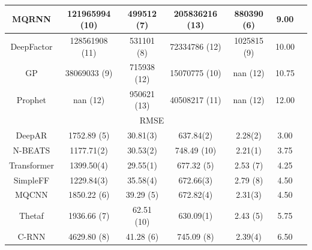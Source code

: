 \begin{table}[htb]
\begin{tabular}{ccccccc}
    MQRNN       & \cellcolor{red!30} 121965994 (10) & 499512 (7)                      & \cellcolor{red!70} 205836216 (13) & 880390 (6)                      & 9.00                \\\hline
    DeepFactor  & \cellcolor{red!50} 128561908 (11) & 531101 (8)                      & \cellcolor{red!50} 72334786 (12)  & 1025815 (9)                     & 10.00               \\\hline
    GP          & 38069033 (9)                      & \cellcolor{red!50} 715938 (12)  & \cellcolor{red!10} 15070775 (10)  & \cellcolor{red!70} nan (12)     & 10.75               \\\hline
    Prophet     & \cellcolor{red!70} nan (12)       & \cellcolor{red!70} 950621 (13)  & \cellcolor{red!30} 40508217 (11)  & \cellcolor{red!70} nan (12)     & 12.00               \\\hline
    \multicolumn{6}{c}{\cellcolor{gray!25}RMSE}                                                                                                                                   \\
    \hline
    DeepAR      & 1752.89 (5)                       & 30.81(3) \cellcolor{green!50}   & 637.84(2) \cellcolor{green!70}    & 2.28(2) \cellcolor{green!70}    & 3.00                \\\hline
    N-BEATS     & 1177.71(2) \cellcolor{green!70}   & 30.53(2) \cellcolor{green!70}   & \cellcolor{red!10} 748.49 (10)    & 2.21(1) \cellcolor{green!100}   & 3.75                \\\hline
    Transformer & 1399.50(4) \cellcolor{green!30}   & 29.55(1) \cellcolor{green!100}  & 677.32 (5)                        & 2.53 (7)                        & 4.25                \\\hline
    SimpleFF    & 1229.84(3) \cellcolor{green!50}   & 35.58(4) \cellcolor{green!30}   & 672.66(3) \cellcolor{green!50}    & 2.79 (8)                        & 4.50                \\\hline
    MQCNN       & 1850.22 (6)                       & 39.29 (5)                       & 672.82(4) \cellcolor{green!30}    & 2.31(3) \cellcolor{green!50}    & 4.50                \\\hline
    Thetaf      & 1936.66 (7)                       & \cellcolor{red!10} 62.51 (10)   & 630.09(1) \cellcolor{green!100}   & 2.43 (5)                        & 5.75                \\\hline
    C-RNN       & 4629.80 (8)                       & 41.28 (6)                       & 745.09 (8)                        & 2.39(4) \cellcolor{green!30}    & 6.50                \\\hline

\end{tabular}
\end{table}
